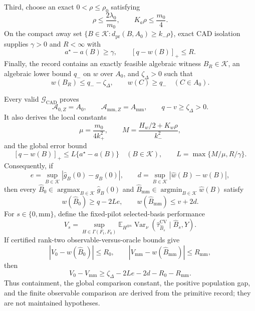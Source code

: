 Third, choose an exact \(0<\rho\le\rho_0\) satisfying
\[
\rho\le\frac{2\lambda_0}{m_0},
\qquad
K_a\rho\le\frac{m_0}{4}.
\tag{R}
\]
On the compact away set \(\{B\in\mathcal K:d_{\mathrm{pr}}(B,A_0)\ge k_-\rho\}\), exact CAD isolation supplies \(\gamma>0\) and \(R<\infty\) with
\[
a^\star-a(B)\ge\gamma,
\qquad
[q-w(B)]_+\le R.
\tag{A}
\]
Finally, the record contains an exactly feasible algebraic witness \(B_R\in\mathcal K\), an algebraic lower bound \(q_-\) on \(w\) over \(A_0\), and \(\zeta_\Delta>0\) such that
\[
w(B_R)\le q_- -\zeta_\Delta,
\qquad
w(C)\ge q_-\quad(C\in A_0).
\tag{W}
\]

Every valid \(\mathscr G_{\mathrm{CAD}}\) proves
\[
\mathcal A_{0,Z}=A_0,
\qquad
\mathcal A_{\mathrm{mm},Z}=A_{\mathrm{mm}},
\qquad
q-v\ge\zeta_\Delta>0.
\]
It also derives the local constants
\[
\mu=\frac{m_0}{4k_+^2},
\qquad
M=\frac{H_w/2+K_w\rho}{k_-^2},
\]
and the global error bound
\[
[q-w(B)]_+
\le L\{a^\star-a(B)\}
\quad(B\in\mathcal K),
\qquad
L=\max\{M/\mu,R/\gamma\}.
\tag{G2}
\]
Consequently, if
\[
e=\sup_{B\in\mathcal K}|\widehat g_B(0)-g_B(0)|,
\qquad
d=\sup_{B\in\mathcal K}|\widehat w(B)-w(B)|,
\]
then every \(\widehat B_0\in\operatorname*{argmax}_{B\in\mathcal K}\widehat g_B(0)\) and \(\widehat B_{\mathrm{mm}}\in\operatorname*{argmin}_{B\in\mathcal K}\widehat w(B)\) satisfy
\[
w(\widehat B_0)\ge q-2Le,
\qquad
w(\widehat B_{\mathrm{mm}})\le v+2d.
\]
For \(s\in\{0,\mathrm{mm}\}\), define the fixed-pilot selected-basis performance
\[
V_s=
\sup_{H\in\Gamma(F_1,F_0)}
\mathbb E_{H^{\otimes n}}
\operatorname{Var}_\nu
(\widehat\tau_{\widehat B_s}^{\mathrm{CV}}\mid\widehat B_s,Y).
\]
If certified rank-two observable-versus-oracle bounds give
\[
|V_0-w(\widehat B_0)|\le R_0,
\qquad
|V_{\mathrm{mm}}-w(\widehat B_{\mathrm{mm}})|\le R_{\mathrm{mm}},
\]
then
\[
V_0-V_{\mathrm{mm}}
\ge\zeta_\Delta-2Le-2d-R_0-R_{\mathrm{mm}}.
\tag{G3}
\]
Thus containment, the global comparison constant, the positive population gap, and the finite observable comparison are derived from the primitive record; they are not maintained hypotheses.